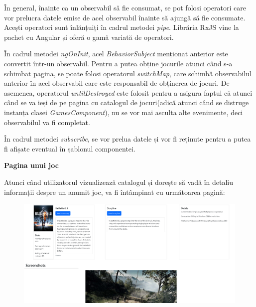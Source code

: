 \documentclass[12pt,a4paper]{report}
\begin{document}
În general, înainte ca un observabil să fie consumat, se pot folosi operatori care vor prelucra datele emise de acel observabil înainte să ajungă să fie consumate. Acești operatori sunt înlănțuiți în cadrul metodei \emph{pipe}. Librăria RxJS \cite{35} vine la pachet cu Angular și oferă o gamă variată de operatori.

În cadrul metodei \emph{ngOnInit}, acel \emph{BehaviorSubject} menționat anterior este convertit într-un observabil. Pentru a putea obține jocurile atunci când s-a schimbat pagina, se poate folosi operatorul \emph{switchMap}, care schimbă observabilul anterior în acel observabil care este responsabil de obținerea de jocuri. De asemenea, operatorul \emph{untilDestroyed} este folosit pentru a asigura faptul că atunci când se va ieși de pe pagina cu catalogul de jocuri(adică atunci când se distruge instanța clasei \emph{GamesComponent}), nu se vor mai asculta alte evenimente, deci observabilul va fi completat.

În cadrul metodei \emph{subscribe}, se vor prelua datele și vor fi reținute pentru a putea fi afișate eventual în șablonul componentei.

\bigskip
\textbf{Pagina unui joc}
\bigskip

Atunci când utilizatorul vizualizează catalogul și dorește să vadă în detaliu informații despre un anumit joc, va fi întâmpinat cu următoarea pagină:

\begin{figure}[H]
\centering
\caption{}
\begin{adjustbox}{max size={\textwidth}{\textheight}}
\includegraphics{exemplu_34_game_details}
\end{adjustbox}

\caption*{}
\end{figure}
\end{document}
